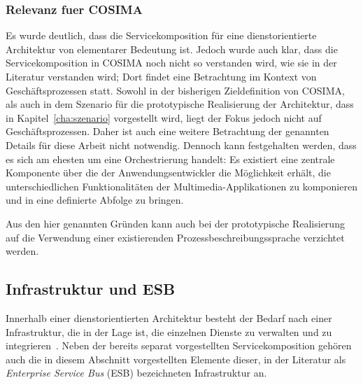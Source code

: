 

\subsubsection{Relevanz fuer COSIMA} %
\label{ssub:relevanz_fuer_cosima_komposition}

  Es wurde deutlich, dass die Servicekomposition für eine dienstorientierte Architektur von elementarer Bedeutung ist. Jedoch wurde auch klar, dass die Servicekomposition in COSIMA noch nicht so verstanden wird, wie sie in der Literatur verstanden wird; Dort findet eine Betrachtung im Kontext von Geschäftsprozessen statt. Sowohl in der bisherigen Zieldefinition von COSIMA, als auch in dem Szenario für die prototypische Realisierung der Architektur, dass in Kapitel~\ref{cha:szenario} vorgestellt wird, liegt der Fokus jedoch nicht auf Geschäftsprozessen. Daher ist auch eine weitere Betrachtung der genannten Details für diese Arbeit nicht notwendig. Dennoch kann festgehalten werden, dass es sich am ehesten um eine Orchestrierung handelt: Es existiert eine zentrale Komponente über die der Anwendungsentwickler die Möglichkeit erhält, die unterschiedlichen Funktionalitäten der Multimedia-Applikationen zu komponieren und in eine definierte Abfolge zu bringen.
  
  Aus den hier genannten Gründen kann auch bei der prototypische Realisierung auf die Verwendung einer existierenden Prozessbeschreibungssprache verzichtet werden.


  

\subsection{Infrastruktur und ESB} %
\label{sub:infrastruktur}

  Innerhalb einer dienstorientierten Architektur besteht der Bedarf nach einer Infrastruktur, die in der Lage ist, die einzelnen Dienste zu verwalten und zu integrieren~\citep[S. 270]{web_services_principles_and_technology}. Neben der bereits separat vorgestellten Servicekomposition gehören auch die in diesem Abschnitt vorgestellten Elemente dieser, in der Literatur als \emph{Enterprise Service Bus} (ESB) bezeichneten Infrastruktur an.
  
